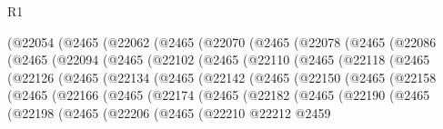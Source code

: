 \begin{lexlean}{R1}
\begin{coremodule}
            (@22054
              (@2465
                (@22062
                  (@2465
                    (@22070
                      (@2465
                        (@22078
                          (@2465
                            (@22086
                              (@2465
                                (@22094
                                  (@2465
                                    (@22102
                                      (@2465
                                        (@22110
                                          (@2465
                                            (@22118
                                              (@2465
                                                (@22126
                                                  (@2465
                                                    (@22134
                                                      (@2465
                                                        (@22142
                                                          (@2465
                                                            (@22150
                                                              (@2465
                                                                (@22158
                                                                  (@2465
                                                                    (@22166
                                                                      (@2465
                                                                        (@22174
                                                                          (@2465
                                                                            (@22182
                                                                              (@2465
                                                                                (@22190
                                                                                  (@2465
                                                                                    (@22198
                                                                                      (@2465
                                                                                        (@22206
                                                                                          (@2465
                                                                                            (@22210
                                                                                              @22212
                                                                                              @2459

\end{coremodule}
\end{lexlean}
